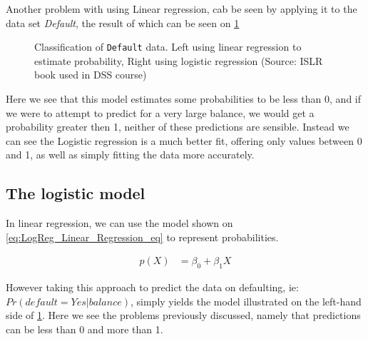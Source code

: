 Another problem with using Linear regression, cab be seen by applying it to the data set \textit{Default}, the result of which can be seen on \cref{fig:LinReg_vs_LogReg}

\begin{figure}[H]
	\centering
	\caption{Classification of \texttt{Default} data. Left using linear regression to estimate probability, Right using logistic regression (Source: ISLR book\cite{book_2015} used in DSS course)}
	\label{fig:LinReg_vs_LogReg}
\end{figure}

Here we see that this model estimates some probabilities to be less than 0, and if we were to attempt to predict for a very large balance, we would get a probability greater then 1, neither of these predictions are sensible. Instead we can see the Logistic regression is a much better fit, offering only values between 0 and 1, as well as simply fitting the data more accurately.

\subsection{The logistic model}

In linear regression, we can use the model shown on \cref{eq:LogReg_Linear_Regression_eq} to represent probabilities.

\begin{equation} \label{eq:LogReg_Linear_Regression_eq}
\begin{split}
p(X) & = \beta_0 + \beta_1 X
\end{split}
\end{equation} 

However taking this approach to predict the data on defaulting, ie: $Pr(default=Yes|balance)$, simply yields the model illustrated on the left-hand side of \cref{fig:LinReg_vs_LogReg}. Here we see the problems previously discussed, namely that predictions can be less than 0 and more than 1.

